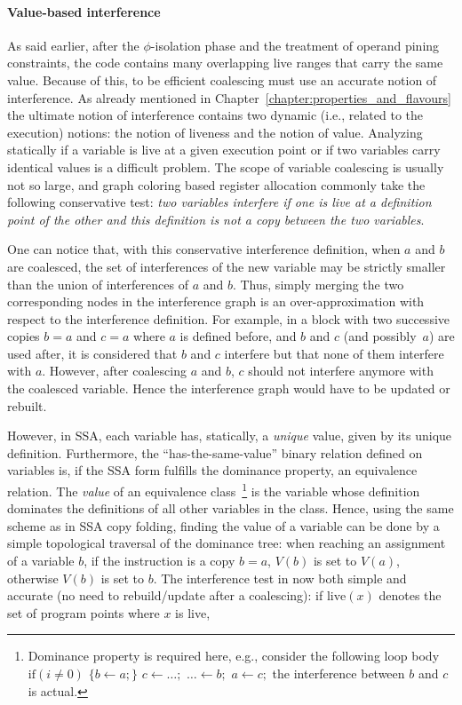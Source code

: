 \paragraph{Value-based interference}
\label{par:alternative_ssa_destruction:value}
As said earlier, after the $\phi$-isolation phase and the treatment of operand pining constraints, the code contains many overlapping live ranges that carry the same value. 
Because of this, to be efficient coalescing must use an accurate notion of interference. 
As already mentioned in Chapter~\ref{chapter:properties_and_flavours} the ultimate notion of interference contains two dynamic (i.e., related to the execution) notions: 
the notion of liveness and the notion of value. 
Analyzing statically if a variable is live at a given execution point or if two variables carry identical values is a difficult problem. 
The scope of variable coalescing is usually not so large, and graph coloring based register allocation commonly take the following conservative test: 
\emph{two variables interfere if one is live at a definition point of the other and this definition is not a copy between the two variables}.

One can notice that, with this conservative interference definition, when $a$ and $b$ are coalesced, the set of interferences of the new variable may be strictly smaller than the union of interferences of $a$ and $b$. 
Thus, simply merging the two corresponding nodes in the interference graph is an over-approximation with respect to the interference definition. 
For example, in a block with two successive copies $b=a$ and $c=a$ where $a$ is defined before, and $b$ and $c$ (and possibly~$a$) are used after, it is considered that $b$ and $c$ interfere but that none of them interfere with $a$. 
However, after coalescing $a$ and $b$, $c$ should not interfere anymore with the coalesced variable. 
Hence the interference graph would have to be updated or rebuilt.


However, in SSA, each variable has, statically, a \emph{unique} value, given by its unique definition. 
Furthermore, the ``has-the-same-value'' binary relation defined on variables is, if the SSA form fulfills the dominance property, an equivalence relation. 
The \emph{value} of an equivalence class~\footnote{Dominance property is required here, e.g., consider the following loop body $\textrm{if}(i\neq 0)$ $\{b\gets a;\}$ $c\gets\dots;$ $\dots\gets b;$ $a\gets c;$ the interference between $b$ and $c$ is actual.} 
is the variable whose definition dominates the definitions of all other variables in the class. 
Hence, using the same scheme as in SSA copy folding, finding the value of a variable can be done by a simple topological traversal of the dominance tree: 
when reaching an assignment of a variable $b$, if the instruction is a copy $b=a$, $V(b)$ is set to $V(a)$, otherwise $V(b)$ is set to $b$. 
The interference test in now both simple and accurate (no need to rebuild/update after a coalescing): 
if $\textrm{live}(x)$ denotes the set of program points where $x$ is live,

